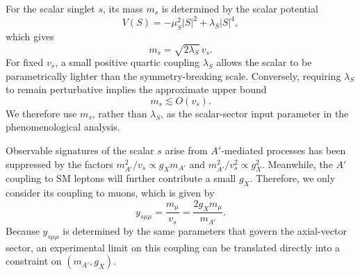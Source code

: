 \documentclass[onecolumn, aps, nofootinbib, prd, preprint, floats, floatfix, amsmath, amssymb, superscriptaddress, preprintnumbers]{revtex4-2}
\begin{document}
For the scalar singlet $s$, its mass $m_s$ is determined by the scalar potential
\begin{equation}
V(S) = -\mu_S^2 |S|^2 + \lambda_S |S|^4,
\end{equation}
which gives
\begin{equation}
m_s=\sqrt{2\lambda_S}\,v_s.
\end{equation}
For fixed $v_s$, a small positive quartic coupling $\lambda_S$ allows the scalar to be parametrically lighter than the symmetry-breaking scale. Conversely, requiring $\lambda_S$ to remain perturbative implies the approximate upper bound
\begin{equation}
m_s \lesssim O(v_s).
\end{equation}
We therefore use $m_s$, rather than $\lambda_S$, as the scalar-sector input parameter in the phenomenological analysis.



Observable signatures of the scalar $s$ arise from $A'$-mediated processes has been suppressed by the factors $m_{A'}^2/v_s \propto g_X m_{A'}$ and $m_{A'}^2/v_s^2 \propto g^2_X$. Meanwhile, the $A'$ coupling to SM leptons will further contribute a small $g_X$. Therefore, we only consider its coupling to muons, which is given by
\begin{equation}
y_{s\mu\mu}=\frac{m_\mu}{v_s}
=\frac{2g_Xm_\mu}{m_{A'}}.
\label{y-and-gX}
\end{equation}
Because $y_{s\mu\mu}$ is determined by the same parameters that govern the axial-vector sector, an experimental limit on this coupling can be translated directly into a constraint on $(m_{A'},g_X)$. 
\end{document}
